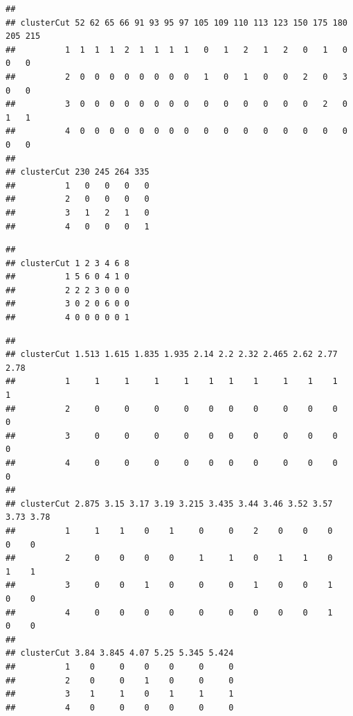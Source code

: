 \documentclass[]{book}
\newenvironment{Shaded}{\begin{snugshade}}{\end{snugshade}}
\newcommand{\KeywordTok}[1]{\textcolor[rgb]{0.13,0.29,0.53}{\textbf{#1}}}
\newcommand{\NormalTok}[1]{#1}
\newcommand{\OperatorTok}[1]{\textcolor[rgb]{0.81,0.36,0.00}{\textbf{#1}}}
\begin{document}
\begin{verbatim}
##           
## clusterCut 52 62 65 66 91 93 95 97 105 109 110 113 123 150 175 180 205 215
##          1  1  1  1  2  1  1  1  1   0   1   2   1   2   0   1   0   0   0
##          2  0  0  0  0  0  0  0  0   1   0   1   0   0   2   0   3   0   0
##          3  0  0  0  0  0  0  0  0   0   0   0   0   0   0   2   0   1   1
##          4  0  0  0  0  0  0  0  0   0   0   0   0   0   0   0   0   0   0
##           
## clusterCut 230 245 264 335
##          1   0   0   0   0
##          2   0   0   0   0
##          3   1   2   1   0
##          4   0   0   0   1
\end{verbatim}

\begin{Shaded}
\end{Shaded}

\begin{verbatim}
##           
## clusterCut 1 2 3 4 6 8
##          1 5 6 0 4 1 0
##          2 2 2 3 0 0 0
##          3 0 2 0 6 0 0
##          4 0 0 0 0 0 1
\end{verbatim}

\begin{Shaded}
\end{Shaded}

\begin{verbatim}
##           
## clusterCut 1.513 1.615 1.835 1.935 2.14 2.2 2.32 2.465 2.62 2.77 2.78
##          1     1     1     1     1    1   1    1     1    1    1    1
##          2     0     0     0     0    0   0    0     0    0    0    0
##          3     0     0     0     0    0   0    0     0    0    0    0
##          4     0     0     0     0    0   0    0     0    0    0    0
##           
## clusterCut 2.875 3.15 3.17 3.19 3.215 3.435 3.44 3.46 3.52 3.57 3.73 3.78
##          1     1    1    0    1     0     0    2    0    0    0    0    0
##          2     0    0    0    0     1     1    0    1    1    0    1    1
##          3     0    0    1    0     0     0    1    0    0    1    0    0
##          4     0    0    0    0     0     0    0    0    0    1    0    0
##           
## clusterCut 3.84 3.845 4.07 5.25 5.345 5.424
##          1    0     0    0    0     0     0
##          2    0     0    1    0     0     0
##          3    1     1    0    1     1     1
##          4    0     0    0    0     0     0
\end{verbatim}
\end{document}

